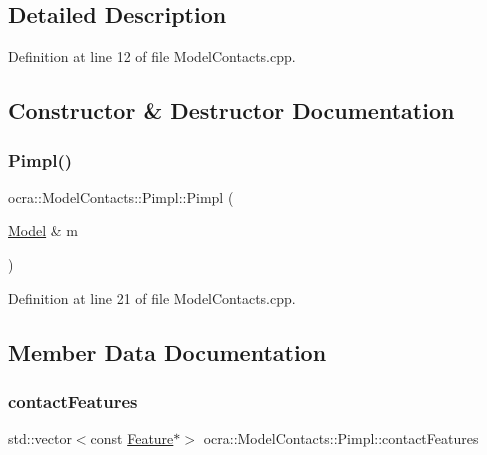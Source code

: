 \subsection{Detailed Description}


Definition at line 12 of file Model\+Contacts.\+cpp.



\subsection{Constructor \& Destructor Documentation}
\hypertarget{structocra_1_1ModelContacts_1_1Pimpl_a49e42d553f4cb66b8c6207e63733d410}{}\label{structocra_1_1ModelContacts_1_1Pimpl_a49e42d553f4cb66b8c6207e63733d410} 
\subsubsection{\texorpdfstring{Pimpl()}{Pimpl()}}
{\footnotesize\ttfamily ocra\+::\+Model\+Contacts\+::\+Pimpl\+::\+Pimpl (\begin{DoxyParamCaption}\item[{\hyperlink{classocra_1_1Model}{Model} \&}]{m }\end{DoxyParamCaption})\hspace{0.3cm}{\ttfamily [inline]}}



Definition at line 21 of file Model\+Contacts.\+cpp.



\subsection{Member Data Documentation}
\hypertarget{structocra_1_1ModelContacts_1_1Pimpl_ac15c6469b805fa54ffb5422a7b1014bd}{}\label{structocra_1_1ModelContacts_1_1Pimpl_ac15c6469b805fa54ffb5422a7b1014bd} 
\subsubsection{\texorpdfstring{contact\+Features}{contactFeatures}}
{\footnotesize\ttfamily std\+::vector$<$const \hyperlink{classocra_1_1Feature}{Feature}$\ast$$>$ ocra\+::\+Model\+Contacts\+::\+Pimpl\+::contact\+Features}



